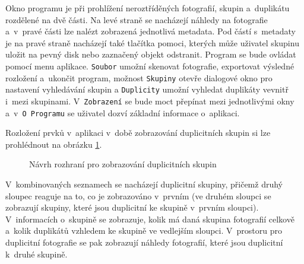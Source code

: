 Okno programu je při prohlížení neroztříděných fotografií, skupin a~duplikátu rozdělené na dvě části. Na levé straně se nacházejí náhledy na fotografie a~v~pravé části lze nalézt zobrazená jednotlivá metadata. Pod částí s~metadaty je na pravé straně nacházejí také tlačítka pomoci, kterých může uživatel skupinu uložit na pevný disk nebo zaznačený objekt odstranit. Program se bude ovládat pomocí menu aplikace. \texttt{Soubor} umožní skenovat fotografie, exportovat výsledné rozložení a~ukončit program, možnost \texttt{Skupiny} otevře dialogové okno pro nastavení vyhledávání skupin a \texttt{Duplicity} umožní vyhledat duplikáty vevnitř i~mezi skupinami. V~\texttt{Zobrazení} se bude moct přepínat mezi jednotlivými okny a~v~\texttt{O~Programu} se uživatel dozví základní informace o~aplikaci.

Rozložení prvků v~aplikaci v~době zobrazování duplicitních skupin si lze prohlédnout na obrázku \ref{navrh_dupl}. 


\begin{figure}[ht]
\begin{center}
\caption{Návrh rozhraní pro zobrazování duplicitních skupin}
\label{navrh_dupl}
\end{center}
\end{figure}

V~kombinovaných seznamech se nacházejí duplicitní skupiny, přičemž druhý sloupec reaguje na to, co je zobrazováno v~prvním (ve druhém sloupci se zobrazují skupiny, které jsou duplicitní ke skupině v~prvním sloupci). V~informacích o~skupině se zobrazuje, kolik má daná skupina fotografií celkově a~kolik duplikátů vzhledem ke skupině ve vedlejším sloupci. V~prostoru pro duplicitní fotografie se pak zobrazují náhledy fotografií, které jsou duplicitní k~druhé skupině.

